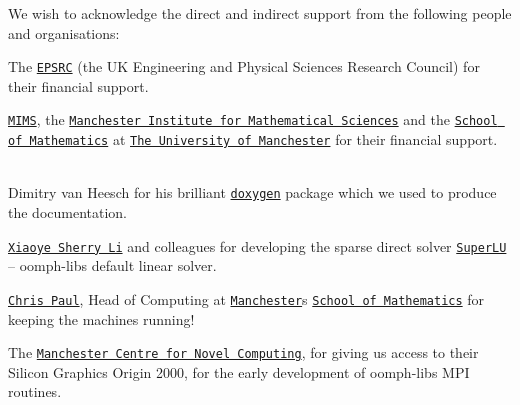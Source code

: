 We wish to acknowledge the direct and indirect support from the following people and organisations\+:
\begin{DoxyItemize}
\item The \href{http://www.epsrc.ac.uk}{\tt E\+P\+S\+RC} (the UK Engineering and Physical Sciences Research Council) for their financial support.~\newline
~\newline

\item \href{http://www.mims.manchester.ac.uk/}{\tt M\+I\+MS}, the \href{http://www.mims.manchester.ac.uk/}{\tt Manchester Institute for Mathematical Sciences} and the \href{http://www.maths.manchester.ac.uk/}{\tt School of Mathematics} at \href{http://www.manchester.ac.uk/}{\tt The University of Manchester} for their financial support. ~\newline
~\newline

\item Dimitry van Heesch for his brilliant \href{http://www.doxygen.org}{\tt doxygen} package which we used to produce the documentation. ~\newline
~\newline

\item \href{http://crd.lbl.gov/~xiaoye/}{\tt Xiaoye Sherry Li} and colleagues for developing the sparse direct solver \href{http://crd.lbl.gov/~xiaoye/SuperLU}{\tt Super\+LU} -- {\ttfamily oomph-\/lib\textquotesingle{}s} default linear solver. ~\newline
~\newline

\item \href{http://www.maths.man.ac.uk/~chris}{\tt Chris Paul}, Head of Computing at \href{http://www.manchester.ac.uk/}{\tt Manchester}\textquotesingle{}s \href{http://www.maths.man.ac.uk/}{\tt School of Mathematics} for keeping the machines running! ~\newline
~\newline

\item The \href{http://www.cs.man.ac.uk/cnc/}{\tt Manchester Centre for Novel Computing}, for giving us access to their Silicon Graphics Origin 2000, for the early development of {\ttfamily oomph-\/lib\textquotesingle{}s} M\+PI routines.~\newline
~\newline


\end{DoxyItemize}
